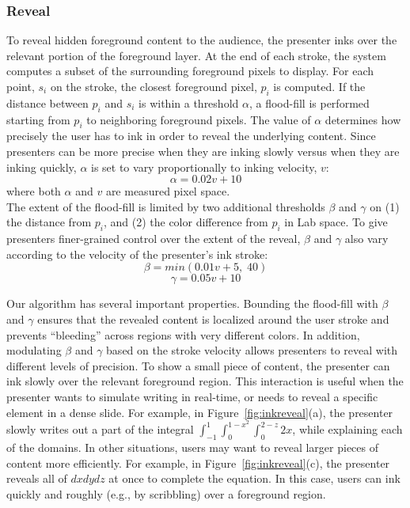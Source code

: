 \subsubsection{Reveal}
To reveal hidden foreground content to the audience, the presenter inks over the relevant portion of the foreground layer.
%
At the end of each stroke, the system computes a subset of the surrounding foreground pixels to display. 
%
For each point, $s_i$ on the stroke, the closest foreground pixel, $p_i$ is computed. If the distance between $p_i$ and $s_i$ is within a threshold $\alpha$, a flood-fill is performed starting from $p_i$ to neighboring foreground pixels. The value of $\alpha$ determines how precisely the user has to ink in order to reveal the underlying content. Since presenters can be more precise when they are inking slowly versus when they are inking quickly, $\alpha$ is set to vary proportionally to inking velocity, $v$:
%
\begin{equation}
\alpha = 0.02v+10
\end{equation}
where both $\alpha$ and $v$ are measured pixel space.\\
 
The extent of the flood-fill is limited by two additional thresholds $\beta$ and $\gamma$ on (1) the distance from $p_i$, and (2) the color difference from $p_i$ in Lab space. 
%
To give presenters finer-grained control over the extent of the reveal, $\beta$ and $\gamma$ also vary according to the velocity of the presenter's ink stroke:\\ 
\begin{equation}
    \beta = min(0.01v+5,\;40)
\end{equation}
%
\begin{equation}
\gamma = 0.05v+10
\end{equation}

Our algorithm has several important properties. Bounding the flood-fill with $\beta$ and $\gamma$ ensures that the revealed content is localized around the user stroke and prevents ``bleeding'' across regions with very different colors.
%
In addition, modulating $\beta$ and $\gamma$ based on the stroke velocity allows presenters to reveal with different levels of precision. 
%
To show a small piece of content, the presenter can ink slowly over the relevant foreground region. This interaction is useful when the presenter wants to simulate writing in real-time, or needs to reveal a specific element in a dense slide. For example, in Figure~\ref{fig:inkreveal}(a), the presenter slowly writes out a part of the integral $\int_{-1}^{1}\int_{0}^{1-x^2}\int_{0}^{2-z}2x$, while explaining each of the domains.
%
In other situations, users may want to reveal larger pieces of content more efficiently. For example, in Figure~\ref{fig:inkreveal}(c), the presenter reveals all of $dxdydz$ at once to complete the equation. In this case, users can ink quickly and roughly (e.g., by scribbling) over a foreground region.

